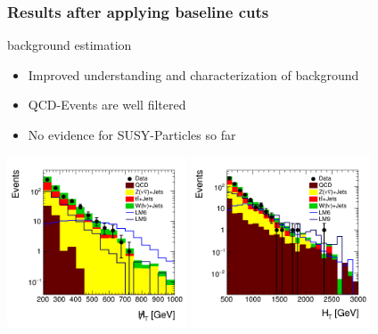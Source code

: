 \begin{frame}
	\frametitle{Results after applying baseline cuts}
	\begin{block}{background estimation}
		\begin{itemize}
			\item Improved understanding and characterization of background 
			\item QCD-Events are well filtered
			\item No evidence for SUSY-Particles so far
		\end{itemize}
	\end{block}
	
	\begin{center}
		\includegraphics[width = 0.4\textwidth]{plots10/hDataVsMC_Mht.png}
		\includegraphics[width = 0.4\textwidth]{plots10/hDataVsMC_Ht.png}
	\end{center}

\end{frame}